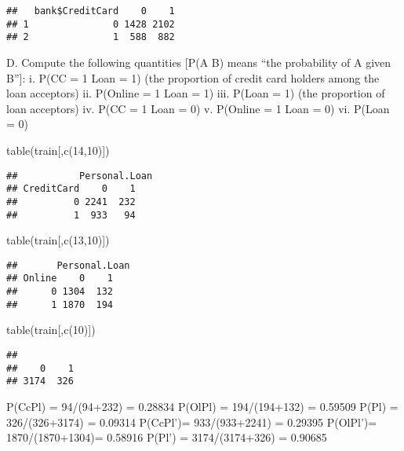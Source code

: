 \documentclass[
]{article}
\newenvironment{Shaded}{\begin{snugshade}}{\end{snugshade}}
\newcommand{\DecValTok}[1]{\textcolor[rgb]{0.00,0.00,0.81}{#1}}
\newcommand{\FunctionTok}[1]{\textcolor[rgb]{0.00,0.00,0.00}{#1}}
\newcommand{\NormalTok}[1]{#1}
\begin{document}
\begin{verbatim}
##   bank$CreditCard    0    1
## 1               0 1428 2102
## 2               1  588  882
\end{verbatim}

D. Compute the following quantities {[}P(A \textbar{} B) means ``the
probability of A given B''{]}: i. P(CC = 1 \textbar{} Loan = 1) (the
proportion of credit card holders among the loan acceptors) ii. P(Online
= 1 \textbar{} Loan = 1) iii. P(Loan = 1) (the proportion of loan
acceptors) iv. P(CC = 1 \textbar{} Loan = 0) v. P(Online = 1 \textbar{}
Loan = 0) vi. P(Loan = 0)

\begin{Shaded}
\begin{Highlighting}[]
\FunctionTok{table}\NormalTok{(train[,}\FunctionTok{c}\NormalTok{(}\DecValTok{14}\NormalTok{,}\DecValTok{10}\NormalTok{)])}
\end{Highlighting}
\end{Shaded}

\begin{verbatim}
##           Personal.Loan
## CreditCard    0    1
##          0 2241  232
##          1  933   94
\end{verbatim}

\begin{Shaded}
\begin{Highlighting}[]
\FunctionTok{table}\NormalTok{(train[,}\FunctionTok{c}\NormalTok{(}\DecValTok{13}\NormalTok{,}\DecValTok{10}\NormalTok{)])}
\end{Highlighting}
\end{Shaded}

\begin{verbatim}
##       Personal.Loan
## Online    0    1
##      0 1304  132
##      1 1870  194
\end{verbatim}

\begin{Shaded}
\begin{Highlighting}[]
\FunctionTok{table}\NormalTok{(train[,}\FunctionTok{c}\NormalTok{(}\DecValTok{10}\NormalTok{)])}
\end{Highlighting}
\end{Shaded}

\begin{verbatim}
## 
##    0    1 
## 3174  326
\end{verbatim}

P(Cc\textbar Pl) = 94/(94+232) = 0.28834 P(Ol\textbar Pl) =
194/(194+132) = 0.59509 P(Pl) = 326/(326+3174) = 0.09314
P(Cc\textbar Pl')= 933/(933+2241) = 0.29395 P(Ol\textbar Pl')=
1870/(1870+1304)= 0.58916 P(Pl') = 3174/(3174+326) = 0.90685
\end{document}
